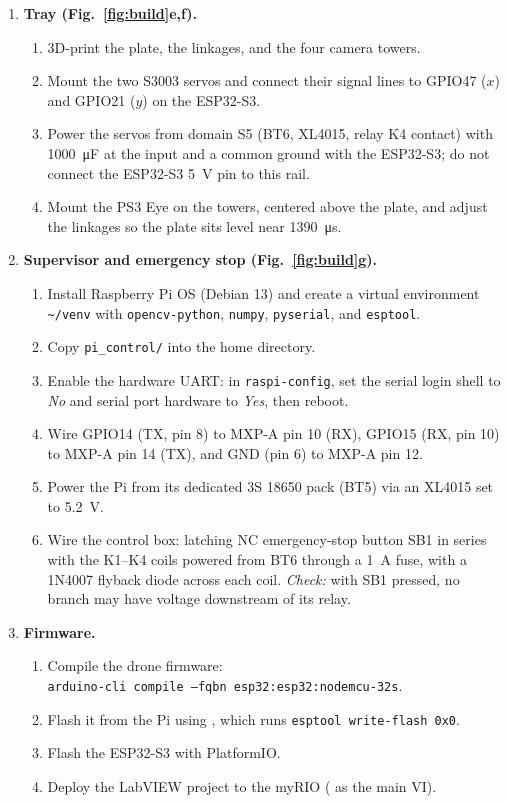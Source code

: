 \begin{enumerate}[label=\textbf{Step \arabic*.}, leftmargin=*, align=left]
  \item \textbf{Tray (Fig.~\ref{fig:build}e,f).}
  \begin{enumerate}[label=(\alph*)]
    \item 3D-print the plate, the linkages, and the four camera towers.
    \item Mount the two S3003 servos and connect their signal lines to GPIO47 ($x$) and GPIO21 ($y$) on the ESP32-S3.
    \item Power the servos from domain S5 (BT6, XL4015, relay K4 contact) with \SI{1000}{\micro\farad} at the input and a common ground with the ESP32-S3; do not connect the ESP32-S3 \SI{5}{\volt} pin to this rail.
    \item Mount the PS3 Eye on the towers, centered above the plate, and adjust the linkages so the plate sits level near \SI{1390}{\micro\second}.
  \end{enumerate}

  \item \textbf{Supervisor and emergency stop (Fig.~\ref{fig:build}g).}
  \begin{enumerate}[label=(\alph*)]
    \item Install Raspberry Pi OS (Debian 13) and create a virtual environment \texttt{\textasciitilde/venv} with \texttt{opencv-python}, \texttt{numpy}, \texttt{pyserial}, and \texttt{esptool}.
    \item Copy \texttt{pi\_control/} into the home directory.
    \item Enable the hardware UART: in \texttt{raspi-config}, set the serial login shell to \emph{No} and serial port hardware to \emph{Yes}, then reboot.
    \item Wire GPIO14 (TX, pin 8) to MXP-A pin 10 (RX), GPIO15 (RX, pin 10) to MXP-A pin 14 (TX), and GND (pin 6) to MXP-A pin 12.
    \item Power the Pi from its dedicated 3S 18650 pack (BT5) via an XL4015 set to \SI{5.2}{\volt}.
    \item Wire the control box: latching NC emergency-stop button SB1 in series with the K1--K4 coils powered from BT6 through a \SI{1}{\ampere} fuse, with a 1N4007 flyback diode across each coil. \emph{Check:} with SB1 pressed, no branch may have voltage downstream of its relay.
  \end{enumerate}

  \item \textbf{Firmware.}
  \begin{enumerate}[label=(\alph*)]
    \item Compile the drone firmware:\\ \texttt{arduino-cli compile --fqbn esp32:esp32:nodemcu-32s}.
    \item Flash it from the Pi using , which runs \texttt{esptool write-flash 0x0}.
    \item Flash the ESP32-S3 with PlatformIO.
    \item Deploy the LabVIEW project to the myRIO ( as the main VI).
  \end{enumerate}


\end{enumerate}
